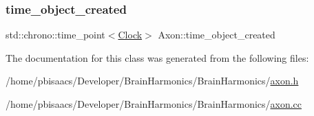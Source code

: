 \mbox{\label{classAxon_a01b83a46da58746087de2c6f1dd30405}} 
\subsubsection{\texorpdfstring{time\+\_\+object\+\_\+created}{time\_object\_created}}
{\footnotesize\ttfamily std\+::chrono\+::time\+\_\+point$<$\mbox{\hyperlink{universe_8h_a0ef8d951d1ca5ab3cfaf7ab4c7a6fd80}{Clock}}$>$ Axon\+::time\+\_\+object\+\_\+created\hspace{0.3cm}{\ttfamily [private]}}



The documentation for this class was generated from the following files\+:\begin{DoxyCompactItemize}
\item 
/home/pbisaacs/\+Developer/\+Brain\+Harmonics/\+Brain\+Harmonics/\mbox{\hyperlink{axon_8h}{axon.\+h}}\item 
/home/pbisaacs/\+Developer/\+Brain\+Harmonics/\+Brain\+Harmonics/\mbox{\hyperlink{axon_8cc}{axon.\+cc}}\end{DoxyCompactItemize}
